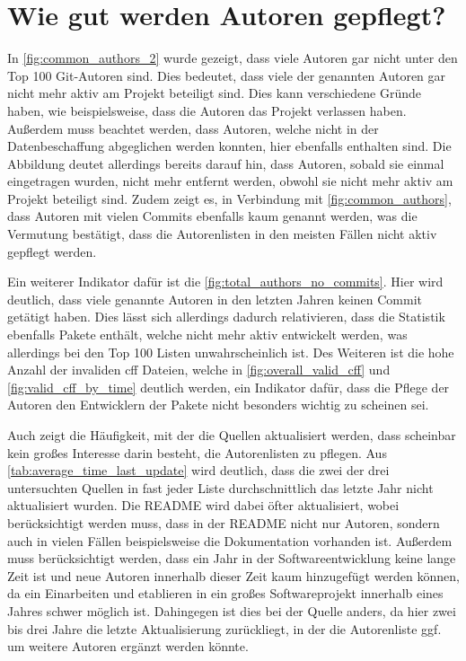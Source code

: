 \section{Wie gut werden Autoren gepflegt?}
\label{sec:autoren_pflege_diskussion}
In \autoref{fig:common_authors_2} wurde gezeigt, dass viele Autoren gar nicht unter den Top 100 Git-Autoren sind.
Dies bedeutet, dass viele der genannten Autoren gar nicht mehr aktiv am Projekt beteiligt sind.
Dies kann verschiedene Gründe haben, wie beispielsweise, dass die Autoren das Projekt verlassen haben.
Außerdem muss beachtet werden, dass Autoren, welche nicht in der Datenbeschaffung abgeglichen werden konnten, hier ebenfalls enthalten sind.
Die Abbildung deutet allerdings bereits darauf hin, dass Autoren, sobald sie einmal eingetragen wurden, nicht mehr entfernt werden, obwohl sie nicht mehr aktiv am Projekt beteiligt sind.
Zudem zeigt es, in Verbindung mit \autoref{fig:common_authors}, dass Autoren mit vielen Commits ebenfalls kaum genannt werden, was die Vermutung bestätigt, dass die Autorenlisten in den meisten Fällen nicht aktiv gepflegt werden.

Ein weiterer Indikator dafür ist die \autoref{fig:total_authors_no_commits}.
Hier wird deutlich, dass viele genannte Autoren in den letzten Jahren keinen Commit getätigt haben.
Dies lässt sich allerdings dadurch relativieren, dass die Statistik ebenfalls Pakete enthält, welche nicht mehr aktiv entwickelt werden, was allerdings bei den Top 100 Listen unwahrscheinlich ist.
Des Weiteren ist die hohe Anzahl der invaliden \gls{cff} Dateien, welche in \autoref{fig:overall_valid_cff} und \autoref{fig:valid_cff_by_time} deutlich werden, ein Indikator dafür, dass die Pflege der Autoren den Entwicklern der Pakete nicht besonders wichtig zu scheinen sei.

Auch zeigt die Häufigkeit, mit der die Quellen aktualisiert werden, dass scheinbar kein großes Interesse darin besteht, die Autorenlisten zu pflegen.
Aus \autoref{tab:average_time_last_update} wird deutlich, dass die zwei der drei untersuchten Quellen in fast jeder Liste durchschnittlich das letzte Jahr nicht aktualisiert wurden.
Die README wird dabei öfter aktualisiert, wobei berücksichtigt werden muss, dass in der README nicht nur Autoren, sondern auch in vielen Fällen beispielsweise die Dokumentation vorhanden ist.
Außerdem muss berücksichtigt werden, dass ein Jahr in der Softwareentwicklung keine lange Zeit ist und neue Autoren innerhalb dieser Zeit kaum hinzugefügt werden können, da ein Einarbeiten und etablieren in ein großes Softwareprojekt innerhalb eines Jahres schwer möglich ist.
Dahingegen ist dies bei der  Quelle anders, da hier zwei bis drei Jahre die letzte Aktualisierung zurückliegt, in der die Autorenliste ggf. um weitere Autoren ergänzt werden könnte.

